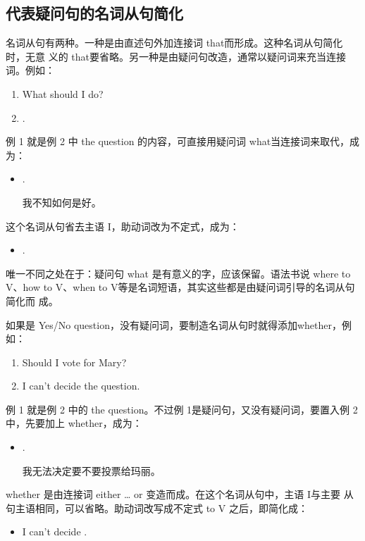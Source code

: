 \subsection{代表疑问句的名词从句简化}

名词从句有两种。一种是由直述句外加连接词 that而形成。这种名词从句简化时，无意
义的 that要省略。另一种是由疑问句改造，通常以疑问词来充当连接词。例如：
\begin{enumerate}
\item What should I do?
\item {}  .
\end{enumerate}
例 1 就是例 2 中 the question 的内容，可直接用疑问词 what当连接词来取代，成
为：
\begin{itemize}
\item {}  .

  我不知如何是好。
\end{itemize}
这个名词从句省去主语 I，助动词改为不定式，成为：
\begin{itemize}
\item {}  .
\end{itemize}
唯一不同之处在于：疑问句 what 是有意义的字，应该保留。语法书说 where to
V、how to V、when to V等是名词短语，其实这些都是由疑问词引导的名词从句简化而
成。

如果是 Yes/No question，没有疑问词，要制造名词从句时就得添加whether，例如：
\begin{enumerate}
\item Should I vote for Mary?
\item I can't decide the question.
\end{enumerate}
例 1 就是例 2 中的 the question。不过例 1是疑问句，又没有疑问词，要置入例 2
中，先要加上 whether，成为：
\begin{itemize}
\item {}   .

  我无法决定要不要投票给玛丽。
\end{itemize}
whether 是由连接词 either \ldots{} or 变造而成。在这个名词从句中，主语 I与主要
从句主语相同，可以省略。助动词改写成不定式 to V 之后，即简化成：
\begin{itemize}
\item I can't decide .
\end{itemize}

